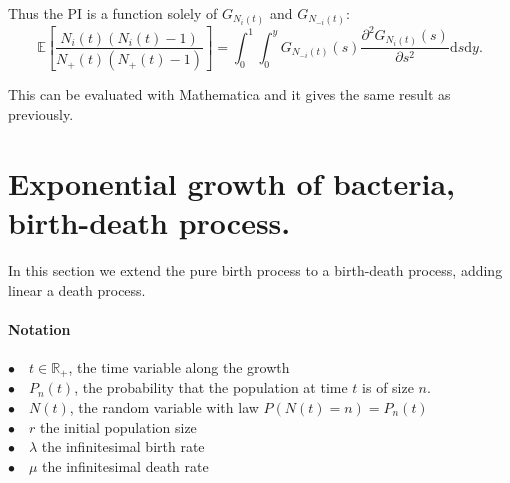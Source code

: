 \documentclass{article}
\newcommand{\ud}{\mathrm{d}}
\begin{document}
 Thus the PI is a function solely of $G_{N_{i}(t)}$ and $G_{N_{-i}(t)}$:
 \begin{equation}
 \displaystyle \mathbb{E}\left[ \dfrac{N_i(t)(N_i(t)-1)}{N_+(t) ( N_+(t)-1 )} \right]= \int_0^1 \int_0^y G_{N_{-i}(t)}(s) \dfrac{\partial^2 G_{N_i(t)}(s)}{\partial s^2} \ud s \ud y.
 \end{equation}

This can be evaluated with Mathematica and it gives the same result as previously.


\section{Exponential growth of bacteria, birth-death process.}

In this section we extend the pure birth process to a birth-death process, adding linear a death process.
 \paragraph{Notation} $ $\\
 $\bullet \quad t \in \mathbb{R}_+$, the time variable along the growth\\
 $\bullet \quad P_n(t)$, the probability that the population at time $t$ is of size $n$.\\
 $\bullet \quad N(t)$, the random variable with law $P(N(t)=n)=P_n(t)$\\
 $\bullet \quad r$ the initial population size\\
 $\bullet \quad \lambda$ the infinitesimal birth rate\\
 $\bullet \quad \mu$ the infinitesimal death rate\\
 
\end{document}
